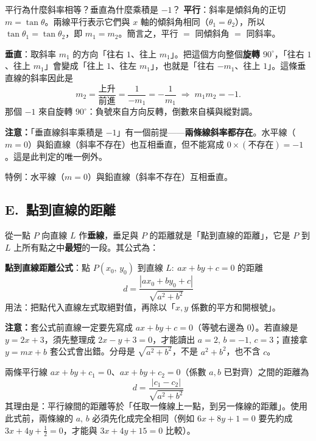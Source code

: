 \documentclass[11pt]{article}
\begin{document}
\begin{補充框}{平行為什麼斜率相等？垂直為什麼乘積是 $-1$？}
\textbf{平行}：斜率是傾斜角的正切 $m=\tan\theta$。兩線平行表示它們與 $x$ 軸的傾斜角相同（$\theta_1=\theta_2$），所以 $\tan\theta_1=\tan\theta_2$，即 $m_1=m_2$。簡言之，平行 $=$ 同傾斜角 $=$ 同斜率。

\textbf{垂直}：取斜率 $m_1$ 的方向「往右 $1$、往上 $m_1$」。把這個方向整個\textbf{旋轉 $90^\circ$}，「往右 $1$、往上 $m_1$」會變成「往上 $1$、往左 $m_1$」，也就是「往右 $-m_1$、往上 $1$」。這條垂直線的斜率因此是
$$m_2=\frac{\text{上升}}{\text{前進}}=\frac{1}{-m_1}=-\frac{1}{m_1}\;\Longrightarrow\;m_1 m_2=-1.$$
那個 $-1$ 來自旋轉 $90^\circ$：負號來自方向反轉，倒數來自橫與縱對調。

\textbf{注意：}「垂直線斜率乘積是 $-1$」有一個前提——\textbf{兩條線斜率都存在}。水平線（$m=0$）與鉛直線（斜率不存在）也互相垂直，但不能寫成 $0\times(\text{不存在})=-1$。這是此判定的唯一例外。
\end{補充框}

特例：水平線（$m=0$）與鉛直線（斜率不存在）互相垂直。

\subsection*{\sffamily E.\ 點到直線的距離}

從一點 $P$ 向直線 $L$ 作\textbf{垂線}，垂足與 $P$ 的距離就是「點到直線的距離」，它是 $P$ 到 $L$ 上所有點之中\textbf{最短}的一段。其公式為：

\textbf{點到直線距離公式}：點 $P(x_0,\,y_0)$ 到直線 $L:\ ax+by+c=0$ 的距離
$$\boxed{\;d=\frac{|ax_0+by_0+c|}{\sqrt{a^2+b^2}}\;}$$
用法：把點代入直線左式取絕對值，再除以「$x,y$ 係數的平方和開根號」。


\textbf{注意：}套公式前直線一定要先寫成 $ax+by+c=0$（等號右邊為 $0$）。若直線是 $y=2x+3$，須先整理成 $2x-y+3=0$，才能讀出 $a=2,\,b=-1,\,c=3$；直接拿 $y=mx+b$ 套公式會出錯。分母是 $\sqrt{a^2+b^2}$，不是 $a^2+b^2$，也不含 $c$。

兩條平行線 $ax+by+c_1=0$、$ax+by+c_2=0$（係數 $a,b$ 已對齊）之間的距離為
$$\boxed{\;d=\frac{|c_1-c_2|}{\sqrt{a^2+b^2}}\;}$$
其理由是：平行線間的距離等於「任取一條線上一點，到另一條線的距離」。使用此式前，兩條線的 $a,\,b$ 必須先化成完全相同（例如 $6x+8y+1=0$ 要先約成 $3x+4y+\tfrac12=0$，才能與 $3x+4y+15=0$ 比較）。
\end{document}
